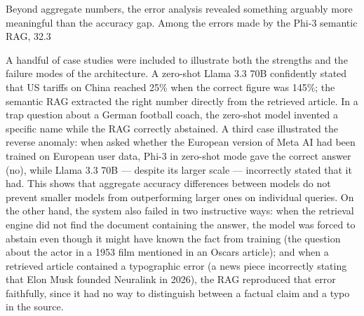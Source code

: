 Beyond aggregate numbers, the error analysis revealed something arguably more meaningful than the accuracy gap. Among the errors made by the Phi-3 semantic RAG, 32.3%

A handful of case studies were included to illustrate both the strengths and the failure modes of the architecture. A zero-shot Llama 3.3 70B confidently stated that US tariffs on China reached 25\% when the correct figure was 145\%; the semantic RAG extracted the right number directly from the retrieved article. In a trap question about a German football coach, the zero-shot model invented a specific name while the RAG correctly abstained. A third case illustrated the reverse anomaly: when asked whether the European version of Meta AI had been trained on European user data, Phi-3 in zero-shot mode gave the correct answer (no), while Llama 3.3 70B --- despite its larger scale --- incorrectly stated that it had. This shows that aggregate accuracy differences between models do not prevent smaller models from outperforming larger ones on individual queries. On the other hand, the system also failed in two instructive ways: when the retrieval engine did not find the document containing the answer, the model was forced to abstain even though it might have known the fact from training (the question about the actor in a 1953 film mentioned in an Oscars article); and when a retrieved article contained a typographic error (a news piece incorrectly stating that Elon Musk founded Neuralink in 2026), the RAG reproduced that error faithfully, since it had no way to distinguish between a factual claim and a typo in the source.

